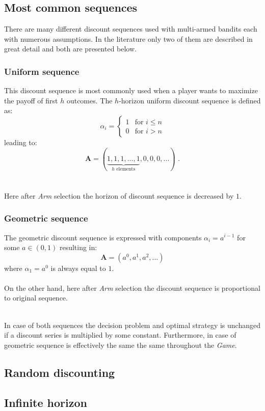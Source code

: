 \documentclass[12pt, a4paper, pdflatex, leqno]{report}
\begin{document}
\subsection{Most common sequences}
There are many different discount sequences used with multi-armed bandits each with numerous assumptions. In the literature only two of them are described in great detail and both are presented below.
{
\subsubsection{Uniform sequence}
This discount sequence is most commonly used when a player wants to maximize the payoff of first $h$ outcomes.
The $h$-horizon uniform discount sequence is defined as:
\[
 \alpha_i =
  \begin{cases}
   1 & \text{for } i \leq n \\
   0 & \text{for } i > n
  \end{cases}
\]
leading to:
\[
  \mathbf{A} = ( \underbrace{ 1, 1, 1, ..., 1}_{h\text{ elements}}, 0, 0, 0, ... ) \text{ .}
\]\\
\\
Here after \emph{Arm} selection the horizon of discount sequence is decreased by $1$.


\subsubsection{Geometric sequence}
The geometric discount sequence is expressed with components $\alpha_i = a^{i-1}$ for some $a \in ( 0, 1 )$ resulting in:
$$
\mathbf{A} = \left( a^0, a^1, a^2, ... \right)
$$
where $\alpha_1 = a^0$ is always equal to $1$.\\
\\
On the other hand, here after \emph{Arm} selection the discount sequence is proportional to original sequence.\\
\\

}
In case of both sequences the decision problem and optimal strategy is unchanged if a discount series is multiplied by some constant. Furthermore, in case of geometric sequence is effectively the same the same throughout the \emph{Game}.

\subsection{Random discounting}
\subsection{Infinite horizon }
\end{document}
